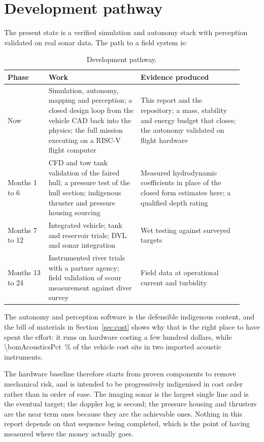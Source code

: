 \documentclass[10pt,a4paper]{article}
\begin{document}
\section{Development pathway}

The present state is a verified simulation and autonomy stack with perception
validated on real sonar data. The path to a field system is:

\begin{table}[htbp]\centering\small
\caption{Development pathway.}
\begin{tabular}{p{0.16\linewidth}p{0.36\linewidth}p{0.40\linewidth}}
\toprule
\textbf{Phase} & \textbf{Work} & \textbf{Evidence produced} \\
\midrule
Now &
Simulation, autonomy, mapping and perception; a closed design loop from the
vehicle CAD back into the physics; the full mission executing on a RISC-V
flight computer &
This report and the repository; a mass, stability and energy budget that
closes; the autonomy validated on flight hardware \\
Months 1 to 6 &
CFD and tow tank validation of the faired hull; a pressure test of the hull
section; indigenous thruster and pressure housing sourcing &
Measured hydrodynamic coefficients in place of the closed form estimates here;
a qualified depth rating \\
Months 7 to 12 &
Integrated vehicle; tank and reservoir trials; DVL and sonar integration &
Wet testing against surveyed targets \\
Months 13 to 24 &
Instrumented river trials with a partner agency; field validation of scour
measurement against diver survey &
Field data at operational current and turbidity \\
\bottomrule
\end{tabular}
\end{table}

The autonomy and perception software is the defensible indigenous content, and
the bill of materials in Section~\ref{sec:cost} shows why that is the right
place to have spent the effort: it runs on hardware costing a few hundred
dollars, while \SI{\bomAcousticsPct}{\percent} of the vehicle cost sits in two
imported acoustic instruments.

The hardware baseline therefore starts from proven components to remove
mechanical risk, and is intended to be progressively indigenised in cost order
rather than in order of ease. The imaging sonar is the largest single line and
is the eventual target; the doppler log is second; the pressure housing and
thrusters are the near term ones because they are the achievable ones. Nothing
in this report depends on that sequence being completed, which is the point of
having measured where the money actually goes.
\end{document}

